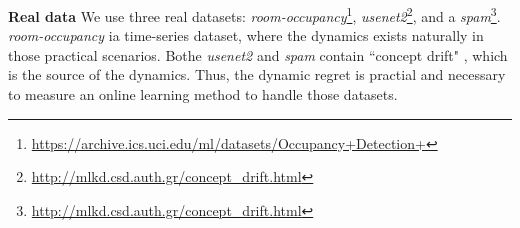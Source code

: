 \documentclass{article}
\begin{document}
\textbf{Real data} We use three real datasets: \textit{room-occupancy}\footnote{\url{https://archive.ics.uci.edu/ml/datasets/Occupancy+Detection+}},  \textit{usenet2}\footnote{\url{http://mlkd.csd.auth.gr/concept_drift.html}}, and a \textit{spam}\footnote{\url{http://mlkd.csd.auth.gr/concept_drift.html}}. \textit{room-occupancy} ia time-series dataset, where the dynamics exists naturally in those practical scenarios. Bothe \textit{usenet2} and \textit{spam} contain ``concept drift" \citep{Katakis:2010:TR}, which is the source of the dynamics.  Thus, the dynamic regret is practial and necessary to measure an online learning method to handle those datasets. 

\end{document}
